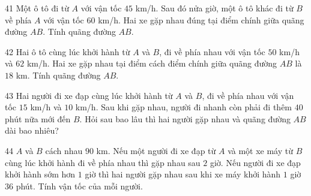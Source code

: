 \gap
\begin{probbox}{41}{}
Một ô tô đi từ $A$ với vận tốc $45$ km/h. Sau đó nửa giờ, một ô tô khác đi từ $B$ về phía $A$ với vận tốc $60$ km/h. Hai xe gặp nhau đúng tại điểm chính giữa quãng đường $AB$. Tính quãng đường $AB$.
\end{probbox}
\gap
\begin{probbox}{42}{}
Hai ô tô cùng lúc khởi hành từ $A$ và $B$, đi về phía nhau với vận tốc $50$ km/h và $62$ km/h. Hai xe gặp nhau tại điểm cách điểm chính giữa quãng đường $AB$ là $18$ km. Tính quãng đường $AB$.
\end{probbox}
\gap
\begin{probbox}{43}{}
Hai người đi xe đạp cùng lúc khởi hành từ $A$ và $B$, đi về phía nhau với vận tốc $15$ km/h và $10$ km/h. Sau khi gặp nhau, người đi nhanh còn phải đi thêm $40$ phút nữa mới đến $B$. Hỏi sau bao lâu thì hai người gặp nhau và quãng đường $AB$ dài bao nhiêu?
\end{probbox}
\gap
\begin{probbox}{44}{}
$A$ và $B$ cách nhau $90$ km. Nếu một người đi xe đạp từ $A$ và một xe máy từ $B$ cùng lúc khởi hành đi về phía nhau thì gặp nhau sau $2$ giờ. Nếu người đi xe đạp khởi hành sớm hơn $1$ giờ thì hai người gặp nhau sau khi xe máy khởi hành $1$ giờ $36$ phút. Tính vận tốc của mỗi người.
\end{probbox}
